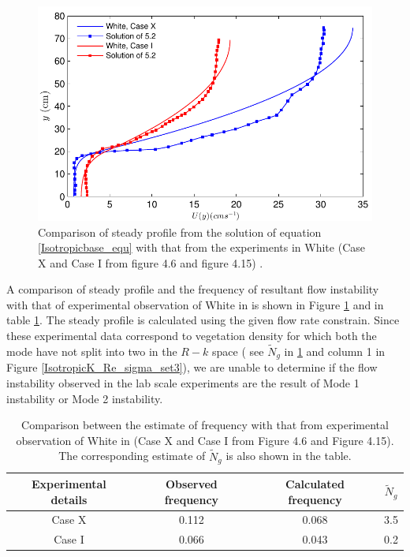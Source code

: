 \documentclass[12pt]{report}   %
\newcommand{\Ndg}{\tilde{N}_g}
\begin{document}
\begin{figure}
 \includegraphics{GrassBaseWhiteIsotropic}
 \caption [Comparison of steady profile from the solution of equation \eqref{Isotropicbase_equ} with that from the experiments in White \cite{White06} (Case X and Case I  ]{Comparison of steady profile from the solution of equation \eqref{Isotropicbase_equ} with that from the experiments in White \cite{White06} (Case X and Case I from figure 4.6 and figure 4.15) . }
 \label{GrassBaseWhiteIsotropic}
\end{figure}

A comparison of steady profile and the frequency of resultant flow instability with that of experimental observation of White in \cite{White06} is shown in Figure \ref{GrassBaseWhiteIsotropic} and in table \ref{tab:FrequencyComparisonIsotropicDrag}. The steady profile is calculated using the given flow rate constrain. Since these experimental data correspond to vegetation density for which both the mode have not split into two in the $R-k$ space ( see $\Ndg$ in \ref{tab:FrequencyComparisonIsotropicDrag} and column 1 in Figure \ref{IsotropicK_Re_sigma_set3}), we are unable to determine if the flow instability observed in the lab scale experiments are the result of Mode 1 instability or Mode 2 instability.
\begin{centering} 
\begin{table}
\begin{tabular}{|c|c|c|c|}
\hline
  Experimental details & Observed frequency & Calculated frequency & $\Ndg$ \\ 
\hline
 Case X &    0.112 & 0.068 &  3.5  \\
 Case I &    0.066 & 0.043 &  0.2 \\


\hline
\end{tabular}
 \caption{Comparison between the estimate of frequency with that from experimental observation of White in \cite{White06} (Case X and Case I from Figure 4.6 and Figure 4.15). The corresponding estimate of $\Ndg$ is also shown in the table. }
 \label{tab:FrequencyComparisonIsotropicDrag}
\end{table}
\end{centering}
\end{document}
